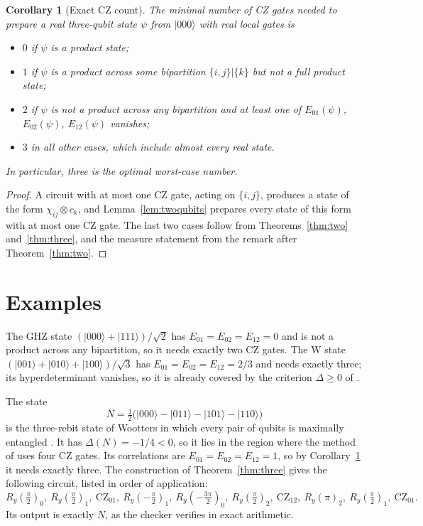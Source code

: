 \documentclass[11pt,a4paper]{article}
\newtheorem{corollary}[theorem]{Corollary}
\theoremstyle{definition}
\theoremstyle{plain}
\newcommand{\ket}[1]{\lvert#1\rangle}
\newcommand{\CZ}{\mathrm{CZ}}
\begin{document}
\begin{corollary}[Exact CZ count]\label{cor:count}
The minimal number of CZ gates needed to prepare a real three-qubit state
$\psi$ from $\ket{000}$ with real local gates is
\begin{itemize}
\item $0$ if $\psi$ is a product state;
\item $1$ if $\psi$ is a product across some bipartition $\{i,j\}|\{k\}$ but not
a full product state;
\item $2$ if $\psi$ is not a product across any bipartition and at least one of
$E_{01}(\psi)$, $E_{02}(\psi)$, $E_{12}(\psi)$ vanishes;
\item $3$ in all other cases, which include almost every real state.
\end{itemize}
In particular, three is the optimal worst-case number.
\end{corollary}

\begin{proof}
A circuit with at most one CZ gate, acting on $\{i,j\}$, produces a state of
the form $\chi_{ij}\otimes c_k$, and Lemma~\ref{lem:twoqubits} prepares every
state of this form with at most one CZ gate. The last two cases follow from
Theorems~\ref{thm:two} and~\ref{thm:three}, and the measure statement from the
remark after Theorem~\ref{thm:two}.
\end{proof}

\section{Examples}\label{sec:examples}
The GHZ state $(\ket{000}+\ket{111})/\sqrt2$ has $E_{01}=E_{02}=E_{12}=0$ and is
not a product across any bipartition, so it needs exactly two CZ gates. The W
state $(\ket{001}+\ket{010}+\ket{100})/\sqrt3$ has
$E_{01}=E_{02}=E_{12}=2/3$ and needs exactly three; its hyperdeterminant
vanishes, so it is already covered by the criterion $\Delta\ge0$ of
\cite{Perdomo2022}.

The state
\[
N=\tfrac12\bigl(\ket{000}-\ket{011}-\ket{101}-\ket{110}\bigr)
\]
is the three-rebit state of Wootters in which every pair of qubits is
maximally entangled \cite[Eq.~(13)]{Wootters2012}. It
has $\Delta(N)=-1/4<0$, so it lies in the region where the method of
\cite{Perdomo2022} uses four CZ gates. Its correlations are
$E_{01}=E_{02}=E_{12}=1$, so by Corollary~\ref{cor:count} it needs exactly three.
The construction of Theorem~\ref{thm:three} gives the following circuit, listed
in order of application:
\[
R_y(\tfrac\pi2)_0,\ R_y(\tfrac\pi2)_1,\ \CZ_{01},\ R_y(-\tfrac\pi2)_1,\
R_y(-\tfrac{3\pi}2)_0,\ R_y(\tfrac\pi2)_2,\ \CZ_{12},\ R_y(\pi)_2,\
R_y(\tfrac\pi2)_1,\ \CZ_{01}.
\]
Its output is exactly $N$, as the checker verifies in exact arithmetic.
\end{document}

